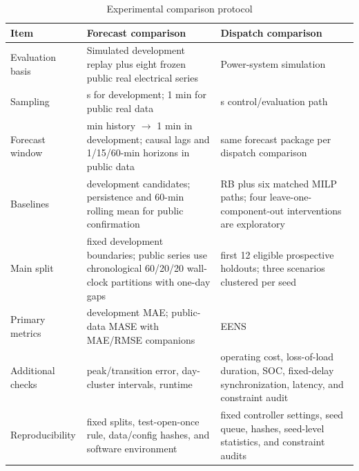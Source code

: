 \begin{table}[!t]
\caption{Experimental comparison protocol}
\label{tab:protocol}
\centering
\footnotesize
\begin{tabular}{@{}
  >{\raggedright\arraybackslash}p{}
  >{\raggedright\arraybackslash}p{}
  >{\raggedright\arraybackslash}p{}@{}}
\toprule
\begin{minipage}[b]{\linewidth}\raggedright
Item
\end{minipage} & \begin{minipage}[b]{\linewidth}\raggedright
Forecast comparison
\end{minipage} & \begin{minipage}[b]{\linewidth}\raggedright
Dispatch comparison
\end{minipage} \\
\midrule
Evaluation basis & Simulated development replay plus eight frozen public real
electrical series & Power-system simulation \\
Sampling & 5 s for development; 1 min for public real data & 5 s control/evaluation path \\
Forecast window & 10 min history $\rightarrow$ 1 min in development; causal
lags and 1/15/60-min horizons in public data & same forecast package per dispatch
comparison \\
Baselines & 11 development candidates; persistence and 60-min rolling mean for
public confirmation & RB plus six matched MILP
paths; four leave-one-component-out interventions are exploratory \\
Main split & fixed development boundaries; public series use chronological
60/20/20 wall-clock partitions with one-day gaps & first 12 eligible prospective
holdouts; three scenarios clustered per seed \\
Primary metrics & development MAE; public-data MASE with MAE/RMSE companions & EENS \\
Additional checks & peak/transition error, day-cluster intervals, runtime & operating cost, loss-of-load duration,
SOC, fixed-delay synchronization, latency, and constraint audit \\
Reproducibility & fixed splits, test-open-once rule, data/config hashes, and
software environment & fixed controller settings, seed queue, hashes, seed-level
statistics, and constraint audits \\
\bottomrule
\end{tabular}
\end{table}

